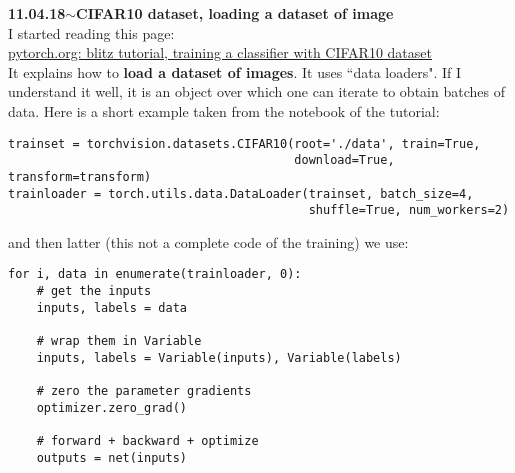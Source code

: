 \documentclass[11pt,a4paper]{article}
\newenvironment{loggentry}[2]%
{\noindent\textbf{#1}\hspace{1cm}$\mathbf{\sim}$\text{ }\textbf{#2}\\}{\vspace{0.5cm}}
\begin{document}
\begin{loggentry}{11.04.18}{CIFAR10 dataset, loading a dataset of image}
I started reading this page:\\
\href{http://pytorch.org/tutorials/beginner/blitz/cifar10_tutorial.html}{pytorch.org: blitz tutorial, training a classifier with CIFAR10 dataset}\\
It explains how to \textbf{load a dataset of images}. It uses ``data loaders". If I understand it well, it is an object over which one can iterate to obtain batches of data. Here is a short example taken from the notebook of the tutorial:\\
\begin{verbatim}
trainset = torchvision.datasets.CIFAR10(root='./data', train=True,
                                        download=True, transform=transform)
trainloader = torch.utils.data.DataLoader(trainset, batch_size=4,
                                          shuffle=True, num_workers=2)
\end{verbatim}
and then latter (this not a complete code of the training) we use:
\begin{verbatim}
for i, data in enumerate(trainloader, 0):
    # get the inputs
    inputs, labels = data

    # wrap them in Variable
    inputs, labels = Variable(inputs), Variable(labels)

    # zero the parameter gradients
    optimizer.zero_grad()

    # forward + backward + optimize
    outputs = net(inputs)
\end{verbatim}
\end{loggentry}
\end{document}
